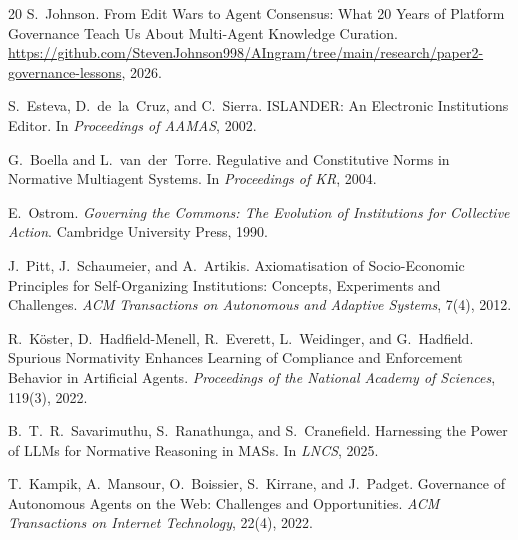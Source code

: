 \documentclass[11pt]{article}
\begin{document}
\begin{thebibliography}{20}
S.~Johnson.
\newblock From Edit Wars to Agent Consensus: What 20 Years of Platform Governance Teach Us About Multi-Agent Knowledge Curation.
\newblock \url{https://github.com/StevenJohnson998/AIngram/tree/main/research/paper2-governance-lessons}, 2026.

S.~Esteva, D.~de~la~Cruz, and C.~Sierra.
\newblock ISLANDER: An Electronic Institutions Editor.
\newblock In \emph{Proceedings of AAMAS}, 2002.

G.~Boella and L.~van~der~Torre.
\newblock Regulative and Constitutive Norms in Normative Multiagent Systems.
\newblock In \emph{Proceedings of KR}, 2004.

E.~Ostrom.
\newblock \emph{Governing the Commons: The Evolution of Institutions for Collective Action}.
\newblock Cambridge University Press, 1990.

J.~Pitt, J.~Schaumeier, and A.~Artikis.
\newblock Axiomatisation of Socio-Economic Principles for Self-Organizing Institutions: Concepts, Experiments and Challenges.
\newblock \emph{ACM Transactions on Autonomous and Adaptive Systems}, 7(4), 2012.

R.~K\"{o}ster, D.~Hadfield-Menell, R.~Everett, L.~Weidinger, and G.~Hadfield.
\newblock Spurious Normativity Enhances Learning of Compliance and Enforcement Behavior in Artificial Agents.
\newblock \emph{Proceedings of the National Academy of Sciences}, 119(3), 2022.

B.~T.~R.~Savarimuthu, S.~Ranathunga, and S.~Cranefield.
\newblock Harnessing the Power of LLMs for Normative Reasoning in MASs.
\newblock In \emph{LNCS}, 2025.

T.~Kampik, A.~Mansour, O.~Boissier, S.~Kirrane, and J.~Padget.
\newblock Governance of Autonomous Agents on the Web: Challenges and Opportunities.
\newblock \emph{ACM Transactions on Internet Technology}, 22(4), 2022.

\end{thebibliography}
\end{document}
